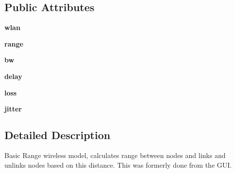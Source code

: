 \subsection*{Public Attributes}
\begin{DoxyCompactItemize}
\item 
\hypertarget{classcore_1_1mobility_1_1_basic_range_model_a2157d55e169d5810879c578e2eda6981}{{\bfseries wlan}}\label{classcore_1_1mobility_1_1_basic_range_model_a2157d55e169d5810879c578e2eda6981}

\item 
\hypertarget{classcore_1_1mobility_1_1_basic_range_model_a4784bd682091f43501b0631f0283d190}{{\bfseries range}}\label{classcore_1_1mobility_1_1_basic_range_model_a4784bd682091f43501b0631f0283d190}

\item 
\hypertarget{classcore_1_1mobility_1_1_basic_range_model_a51515ef835e37cf600ac57dd8934868c}{{\bfseries bw}}\label{classcore_1_1mobility_1_1_basic_range_model_a51515ef835e37cf600ac57dd8934868c}

\item 
\hypertarget{classcore_1_1mobility_1_1_basic_range_model_a1af42561ab9399d9cbb5dd6cdb5911a5}{{\bfseries delay}}\label{classcore_1_1mobility_1_1_basic_range_model_a1af42561ab9399d9cbb5dd6cdb5911a5}

\item 
\hypertarget{classcore_1_1mobility_1_1_basic_range_model_ac20c55cf1dcf544d769b657e3a8f826e}{{\bfseries loss}}\label{classcore_1_1mobility_1_1_basic_range_model_ac20c55cf1dcf544d769b657e3a8f826e}

\item 
\hypertarget{classcore_1_1mobility_1_1_basic_range_model_a7e6de2a415403d0183630a934fc2d0d1}{{\bfseries jitter}}\label{classcore_1_1mobility_1_1_basic_range_model_a7e6de2a415403d0183630a934fc2d0d1}

\end{DoxyCompactItemize}


\subsection{Detailed Description}
\begin{DoxyVerb}Basic Range wireless model, calculates range between nodes and links
and unlinks nodes based on this distance. This was formerly done from
the GUI.
\end{DoxyVerb}
 

